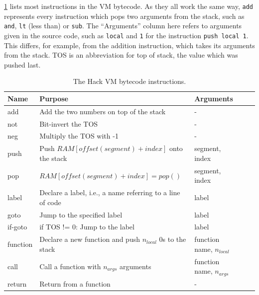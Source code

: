 \cref{table:vm-instructions} lists most instructions in the VM bytecode.
As they all work the same way, \verb+add+ represents every instruction which pops two arguments from the stack, such as \verb+and+, \verb+lt+ (less than) or \verb+sub+.
The ``Arguments'' column here refers to arguments given in the source code, such as \verb+local+ and \verb+1+ for the instruction \verb+push local 1+.
This differs, for example, from the addition instruction, which takes its arguments from the stack.
TOS is an abbreviation for top of stack, the value which was pushed last.

\begin{table}[h]
  \begin{center}
    \centering
    \begin{tabular}{@{}lllll@{}}
      \toprule
      Name     & Purpose                                                      & Arguments \\
      \midrule
      add      & Add the two numbers on top of the stack                      & - \\
      not      & Bit-invert the TOS                                           & - \\
      neg      & Multiply the TOS with -1                                     & - \\
      push     & Push \(RAM[offset(segment)+index]\) onto the stack           & segment, index \\
      pop      & \(RAM[offset(segment)+index] = pop()\)                       & segment, index \\
      label    & Declare a label, i.e., a name referring to a line of code    & label \\
      goto     & Jump to the specified label                                  & label \\
      if-goto  & if TOS != 0: Jump to the label                               & label \\
      function & Declare a new function and push \(n_{local}\) 0s to the stack & function name, \(n_{local}\) \\
      call     & Call a function with \(n_{args}\) arguments                   & function name, \(n_{args}\) \\
      return   & Return from a function                                        &         - \\
      \bottomrule
    \end{tabular}
    \caption{The Hack VM bytecode instructions.}
    \label{table:vm-instructions}
  \end{center}
\end{table}

